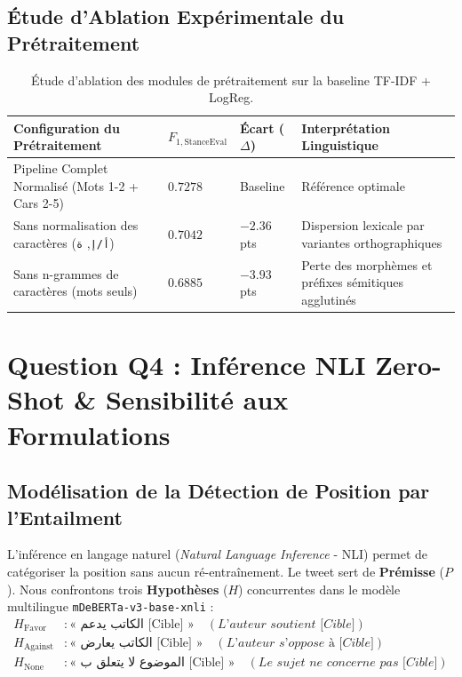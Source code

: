 \documentclass[11pt,a4paper]{article}
\begin{document}
\subsection{Étude d'Ablation Expérimentale du Prétraitement}
\begin{table}[htbp]
\centering
\caption{Étude d'ablation des modules de prétraitement sur la baseline TF-IDF + LogReg.}
\label{tab:ablation_preproc}
\begin{tabularx}{\textwidth}{lXXX}
\toprule
\textbf{Configuration du Prétraitement} & \textbf{$F_{1,\text{StanceEval}}$} & \textbf{Écart ($\Delta$)} & \textbf{Interprétation Linguistique} \\
\midrule
Pipeline Complet Normalisé (Mots 1-2 + Cars 2-5) & $\mathbf{0.7278}$ & Baseline & Référence optimale \\
Sans normalisation des caractères (\texttt{أ/إ}, \texttt{ة}) & $0.7042$ & $-2.36$ pts & Dispersion lexicale par variantes orthographiques \\
Sans n-grammes de caractères (mots seuls) & $0.6885$ & $-3.93$ pts & Perte des morphèmes et préfixes sémitiques agglutinés \\
\bottomrule
\end{tabularx}
\end{table}

\section{Question Q4 : Inférence NLI Zero-Shot \& Sensibilité aux Formulations}

\subsection{Modélisation de la Détection de Position par l'Entailment}
L'inférence en langage naturel (\textit{Natural Language Inference} - NLI) permet de catégoriser la position sans aucun ré-entraînement. Le tweet sert de \textbf{Prémisse} ($P$). Nous confrontons trois \textbf{Hypothèses} ($H$) concurrentes dans le modèle multilingue \texttt{mDeBERTa-v3-base-xnli} :
\begin{align}
    H_{\text{Favor}} &: \text{« الكاتب يدعم [Cible] »} \quad (\textit{L'auteur soutient [Cible]}) \\
    H_{\text{Against}} &: \text{« الكاتب يعارض [Cible] »} \quad (\textit{L'auteur s'oppose à [Cible]}) \\
    H_{\text{None}} &: \text{« الموضوع لا يتعلق ب [Cible] »} \quad (\textit{Le sujet ne concerne pas [Cible]})
\end{align}
\end{document}
